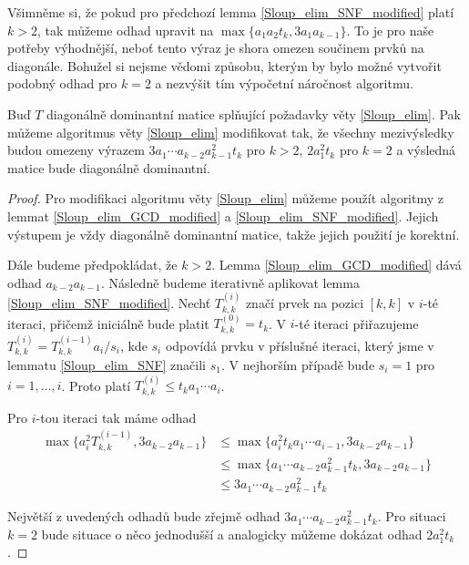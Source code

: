 \begin{pozn}
Všimněme si, že pokud pro předchozí lemma \ref{Sloup_elim_SNF_modified} platí
$ k > 2 $, tak můžeme odhad upravit na $ \max\{ a_1 a_2 t_k, 3 a_1 a_{k - 1} \} $.
To je pro naše potřeby výhodnější, neboť tento výraz je shora omezen součinem 
prvků na diagonále. Bohužel si nejsme vědomi způsobu, kterým by bylo možné 
vytvořit podobný odhad pro $ k = 2 $ a nezvýšit tím výpočetní náročnost
algoritmu.
\end{pozn}



\begin{lem} \label{Sloup_elim_modified}
Buď $ T $ diagonálně dominantní matice splňující požadavky věty \ref{Sloup_elim}.
Pak můžeme algoritmus věty \ref{Sloup_elim} modifikovat tak, že všechny
mezivýsledky budou omezeny výrazem $ 3 a_1 \cdots a_{k - 2} a_{k - 1}^2 t_k $ 
pro $ k > 2 $, $ 2 a_1^2 t_k $ pro $ k = 2 $ a výsledná matice bude diagonálně 
dominantní.
\end{lem}
\begin{proof}
Pro modifikaci algoritmu věty \ref{Sloup_elim} můžeme použít algoritmy z lemmat
\ref{Sloup_elim_GCD_modified} a \ref{Sloup_elim_SNF_modified}. Jejich výstupem
je vždy diagonálně dominantní matice, takže jejich použití je korektní.

Dále budeme předpokládat, že $ k > 2 $.
Lemma \ref{Sloup_elim_GCD_modified} dává odhad $ a_{k - 2} a_{k - 1} $. 
Následně budeme iterativně aplikovat lemma \ref{Sloup_elim_SNF_modified}.
Nechť $ T_{k,k}^{(i)} $ značí prvek na pozici $ [k, k] $ v $ i $-té iteraci, 
přičemž iniciálně bude platit $ T_{k,k}^{(0)} = t_k $. V $ i $-té 
iteraci přiřazujeme $ T_{k,k}^{(i)} = T_{k,k}^{(i - 1)} a_i / s_i $, 
kde $ s_i $ odpovídá prvku v příslušné iteraci, který jsme v lemmatu 
\ref{Sloup_elim_SNF} značili $ s_1 $.
V nejhorším případě bude $ s_i = 1 $ pro $ i = 1, \dots, i $. Proto platí 
$ T_{k,k}^{(i)} \leq t_k a_1 \cdots a_i $. 

Pro $ i $-tou iteraci tak máme odhad 
\begin{align*}
\max\{ a_i^2 T_{k,k}^{(i - 1)}, 3 a_{k - 2} a_{k - 1} \} 
    & \leq \max\{ a_i^2 t_k a_1 \cdots a_{i - 1} , 3 a_{k - 2} a_{k - 1} \} \\
    & \leq \max\{ a_1 \cdots a_{k - 2} a_{k - 1}^2 t_k, 3 a_{k - 2} a_{k - 1} \} \\
    & \leq 3 a_1 \cdots a_{k - 2} a_{k - 1}^2 t_k
\end{align*}

Největší z uvedených odhadů bude zřejmě odhad $ 3 a_1 \cdots a_{k - 2} a_{k - 1}^2 t_k $.
Pro situaci $ k = 2 $ bude situace o něco jednodušší a analogicky můžeme dokázat
odhad $ 2 a_1^2 t_k $.
\end{proof}


